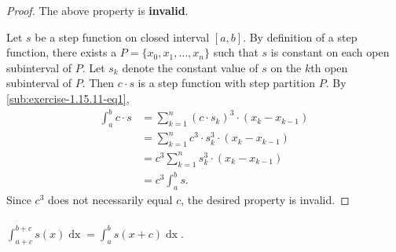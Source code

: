 \documentclass{report}
\begin{document}
\begin{proof}

  The above property is \textbf{invalid}.

  \vspace{6pt}

  Let $s$ be a step function on closed interval $[a, b]$.
  By definition of a step function, there exists a 
    $P = \{x_0, x_1, \ldots, x_n\}$ such that $s$ is constant on each open
    subinterval of $P$.
  Let $s_k$ denote the constant value of $s$ on the $k$th open subinterval of
    $P$.
  Then $c \cdot s$ is a step function with step partition $P$.
  By \eqref{sub:exercise-1.15.11-eq1},
    \begin{align*}
      \int_a^b c \cdot s
        & = \sum_{k=1}^n (c \cdot s_k)^3 \cdot (x_k - x_{k-1}) \\
        & = \sum_{k=1}^n c^3 \cdot s_k^3 \cdot (x_k - x_{k-1}) \\
        & = c^3 \sum_{k=1}^n s_k^3 \cdot (x_k - x_{k-1}) \\
        & = c^3 \int_a^b s.
    \end{align*}
  Since $c^3$ does not necessarily equal $c$, the desired property is invalid.

\end{proof}

\subsubsection{}%
\label{ssub:exercise-1.15.11d}

$\int_{a+c}^{b+c} s(x) \mathop{dx} = \int_a^b s(x + c) \mathop{dx}$.

\end{document}
